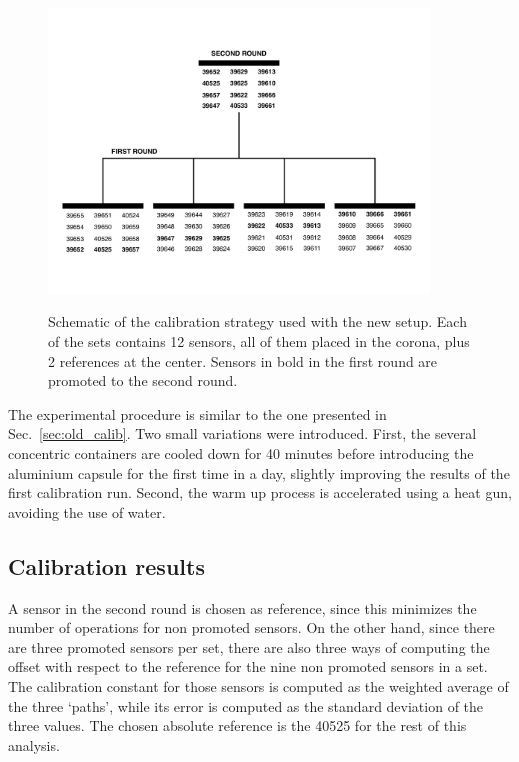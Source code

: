 \label{sec:newCalibrationStrategy}
\begin{figure}[htbp]
\centering
{\includegraphics[width=0.9\textwidth]{images/figure_18.pdf}}
\caption{Schematic of the calibration strategy used with the new setup. Each of the sets contains 12 sensors, all of them placed in the corona, plus 2 references at the center. Sensors in bold in the first round are promoted to the second round.}
\label{fig:newCalibrationStrategy}
\end{figure}

The experimental procedure is similar to the one presented in Sec.~\ref{sec:old_calib}. Two small variations were introduced. First, the several concentric containers are cooled down for 40 minutes before introducing the aluminium capsule for the first time in a day, slightly improving the results of the first calibration run. Second, the warm up process is accelerated using a heat gun, avoiding the use of water.

\subsection{Calibration results}
\label{sec:new_calib_results}

\noindent A sensor in the second round is chosen as reference, since this minimizes the number of operations for non promoted sensors. On the other hand, since there are three promoted sensors per set, there are also three ways of computing the offset with respect to the reference for the nine non promoted sensors in a set. The calibration constant for those sensors is computed as the weighted average of the three `paths', while its error is computed as the standard deviation of the three values. The chosen absolute reference is the 40525 for the rest of this analysis.

